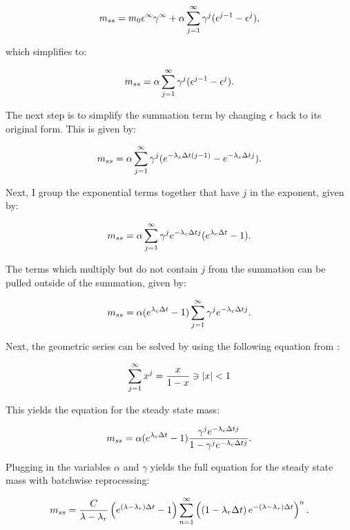 \begin{equation} \hfill
m_{ss} = m_0 \epsilon^{\infty} \gamma^{\infty} + \alpha \sum_{j=1}^{\infty} \gamma^j (\epsilon^{j-1} - \epsilon^j),
\hfill \end{equation}

which simplifies to:
 
\begin{equation} \hfill
m_{ss} = \alpha \sum_{j=1}^{\infty} \gamma^j (\epsilon^{j-1} - \epsilon^j).
\hfill \end{equation}

The next step is to simplify the summation term by changing $\epsilon$ back to its original form.
This is given by:

\begin{equation} \hfill
m_{ss} = \alpha \sum_{j=1}^{\infty} \gamma^j (e^{-\lambda_c \Delta t (j-1)} - e^{-\lambda_c \Delta t j}).
\hfill \end{equation}

Next, I group the exponential terms together that have $j$ in the exponent, given by:

\begin{equation} \hfill
m_{ss} = \alpha \sum_{j=1}^{\infty} \gamma^j e^{-\lambda_c \Delta t j} (e^{\lambda_c \Delta t} - 1).
\hfill \end{equation}

The terms which multiply but do not contain $j$ from the summation can be pulled outside of the summation, given by:

\begin{equation} \hfill
m_{ss} = \alpha (e^{\lambda_c \Delta t} - 1) \sum_{j=1}^{\infty} \gamma^j e^{-\lambda_c \Delta t j}.
\hfill \end{equation}

Next, the geometric series can be solved by using the following equation from \cite{Mathematica}:

\begin{equation} \hfill
\sum_{j=1}^{\infty} x^j = \frac{x}{1-x} \ni |x| < 1
\hfill \end{equation}

This yields the equation for the steady state mass:

\begin{equation} \hfill
m_{ss} = \alpha (e^{\lambda_c \Delta t} - 1) \frac{\gamma^j e^{-\lambda_c \Delta t j}}{1 - \gamma^j e^{-\lambda_c \Delta t j}}.
\hfill \end{equation}

Plugging in the variables $\alpha$ and $\gamma$ yields the full equation for the steady state mass with batchwise reprocessing:

\begin{equation} \hfill 
m_{ss} =  \frac{C}{\lambda - \lambda_r} \left(e^{(\lambda - \lambda_r) \Delta t} - 1 \right) \sum_{n=1}^{\infty} \left( \left(1 - \lambda_r \Delta t \right) e^{-(\lambda - \lambda_r) \Delta t} \right)^n.
\hfill \end{equation}
